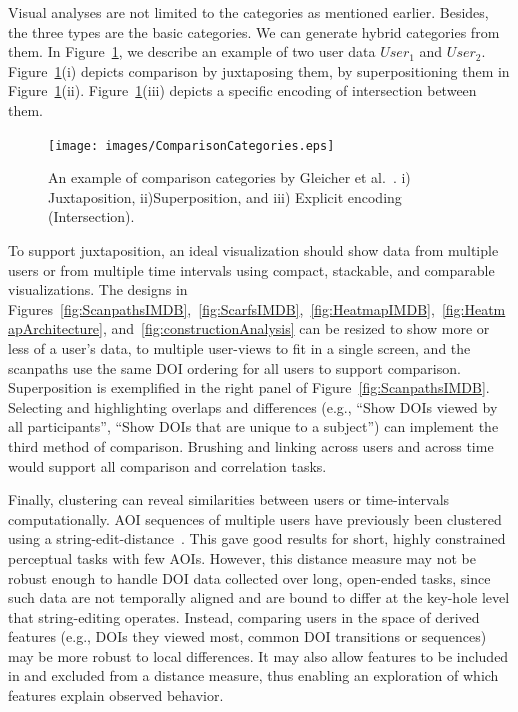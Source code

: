 Visual analyses are not limited to the categories as mentioned earlier. Besides, the three types are the basic categories. We can generate hybrid categories from them. In Figure~\ref{fig:ComparisonCategories}, we describe an example of two user data $User_1$ and $User_2$. Figure~\ref{fig:ComparisonCategories}(i) depicts comparison by juxtaposing them, by superpositioning them in Figure~\ref{fig:ComparisonCategories}(ii). Figure~\ref{fig:ComparisonCategories}(iii) depicts a specific encoding of intersection between them.  
\begin{figure}[htbp]
  \centering
  \texttt{[image: images/ComparisonCategories.eps]}
  \caption{An example of comparison categories by Gleicher et al.~\cite{Glei11}. i) Juxtaposition, ii)Superposition, and iii) Explicit encoding (Intersection).}
	\label{fig:ComparisonCategories}
\end{figure}

To support juxtaposition, an ideal visualization should show data from multiple users or from multiple time intervals using compact, stackable, and comparable visualizations. The designs in Figures~\ref{fig:ScanpathsIMDB},~\ref{fig:ScarfsIMDB},~\ref{fig:HeatmapIMDB},~\ref{fig:HeatmapArchitecture}, and~\ref{fig:constructionAnalysis} can be resized to show more or less of a user's data, to multiple user-views to fit in a single screen, and the scanpaths use the same DOI ordering for all users to support comparison. Superposition is exemplified in the right panel of Figure~\ref{fig:ScanpathsIMDB}. Selecting and highlighting overlaps and differences (e.g., ``Show DOIs viewed by all participants'', ``Show DOIs that are unique to a subject'') can implement the third method of comparison. Brushing and linking across users and across time would support all comparison and correlation tasks.

Finally, clustering can reveal similarities between users or time-intervals computationally. AOI sequences of multiple users have previously been clustered using a string-edit-distance~\cite{Kur14}. This gave good results for short, highly constrained perceptual tasks with few AOIs. However, this distance measure may not be robust enough to handle DOI data collected over long, open-ended tasks, since such data are not temporally aligned and are bound to differ at the key-hole level that string-editing operates. Instead, comparing users in the space of derived features (e.g., DOIs they viewed most, common DOI transitions or sequences) may be more robust to local differences. It may also allow features to be included in and excluded from a distance measure, thus enabling an exploration of which features explain observed behavior.



